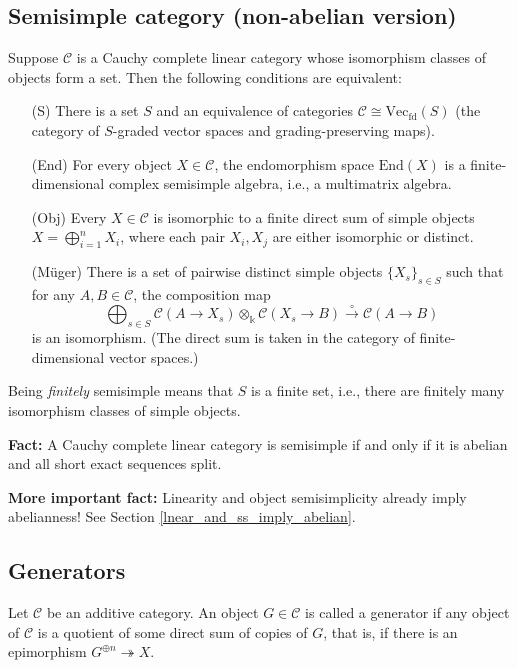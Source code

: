 \documentclass[11pt]{article}
\newcommand{\C}{\mathcal{C}}
\theoremstyle{definition}
\begin{document}
\subsection{Semisimple category (non-abelian version)}
Suppose $\mathcal{C}$ is a Cauchy complete linear category whose isomorphism classes of objects form a set. Then the following conditions are equivalent:
\begin{itemize}
    \item[(S)] There is a set $S$ and an equivalence of categories $\mathcal{C} \cong \mathrm{Vec}_{\mathrm{fd}}(S)$ (the category of $S$-graded vector spaces and grading-preserving maps).
    \item[(End)] For every object $X \in \mathcal{C}$, the endomorphism space $\mathrm{End}(X)$ is a finite-dimensional complex semisimple algebra, i.e., a multimatrix algebra.
    \item[(Obj)] Every $X \in \mathcal{C}$ is isomorphic to a finite direct sum of simple objects $X = \bigoplus_{i=1}^n X_i$, where each pair $X_i, X_j$ are either isomorphic or distinct.
    \item[(M\"uger)] There is a set of pairwise distinct simple objects $\{X_s\}_{s \in S}$ such that for any $A,B \in \mathcal{C}$, the composition map
    \[
    \bigoplus_{s \in S} \mathcal{C}(A \to X_s) \otimes_{\Bbbk} \mathcal{C}(X_s \to B) \xrightarrow{\circ} \mathcal{C}(A \to B)
    \]
    is an isomorphism. (The direct sum is taken in the category of finite-dimensional vector spaces.)
\end{itemize}

Being \emph{finitely} semisimple means that $S$ is a finite set, i.e., there are finitely many isomorphism classes of simple objects.

\medskip

\noindent\textbf{Fact:} A Cauchy complete linear category is semisimple if and only if it is abelian and all short exact sequences split.

\medskip

\noindent\textbf{More important fact:} Linearity and object semisimplicity already imply abelianness! See Section \ref{lnear_and_ss_imply_abelian}.


\subsection{Generators}


Let $\C$ be an additive category. An object $G \in \C$ is called a generator if any object of $\C$ is a quotient of some direct sum of copies of $G$, that is, if there is an epimorphism $G^{\oplus n} \twoheadrightarrow X$.\medskip
\end{document}

